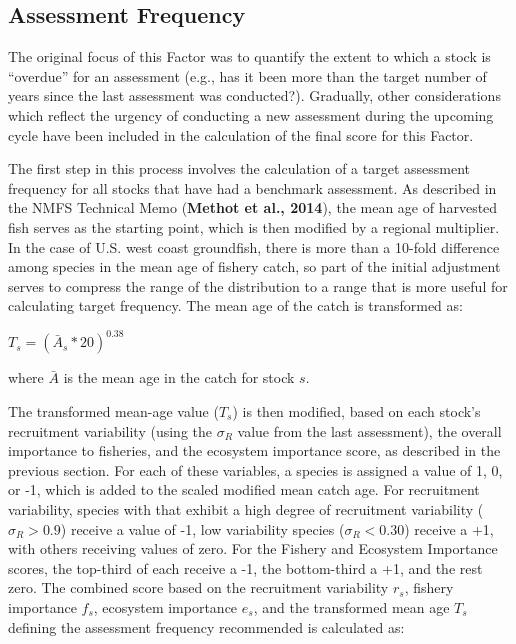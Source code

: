 \documentclass[12pt,]{article}
\begin{document}
\FloatBarrier

\subsection{Assessment Frequency}\label{assessment-frequency}

The original focus of this Factor was to quantify the extent to which a
stock is ``overdue'' for an assessment (e.g., has it been more than the
target number of years since the last assessment was conducted?).
Gradually, other considerations which reflect the urgency of conducting
a new assessment during the upcoming cycle have been included in the
calculation of the final score for this Factor.

The first step in this process involves the calculation of a target
assessment frequency for all stocks that have had a benchmark
assessment. As described in the NMFS Technical Memo (\textbf{Methot et
al., 2014}), the mean age of harvested fish serves as the starting
point, which is then modified by a regional multiplier. In the case of
U.S. west coast groundfish, there is more than a 10-fold difference
among species in the mean age of fishery catch, so part of the initial
adjustment serves to compress the range of the distribution to a range
that is more useful for calculating target frequency. The mean age of
the catch is transformed as:

\begin{centering}

  $T_s = (\bar{A}_s*20)^{0.38}$

\end{centering}

where \(\bar{A}\) is the mean age in the catch for stock \(s\).

The transformed mean-age value (\(T_s\)) is then modified, based on each
stock's recruitment variability (using the \(\sigma_R\) value from the
last assessment), the overall importance to fisheries, and the ecosystem
importance score, as described in the previous section. For each of
these variables, a species is assigned a value of 1, 0, or -1, which is
added to the scaled modified mean catch age. For recruitment
variability, species with that exhibit a high degree of recruitment
variability (\(\sigma_R > 0.9\)) receive a value of -1, low variability
species (\(\sigma_R < 0.30\)) receive a +1, with others receiving values
of zero. For the Fishery and Ecosystem Importance scores, the top-third
of each receive a -1, the bottom-third a +1, and the rest zero. The
combined score based on the recruitment variability \(r_s\), fishery
importance \(f_s\), ecosystem importance \(e_s\), and the transformed
mean age \(T_s\) defining the assessment frequency recommended is
calculated as:
\end{document}
